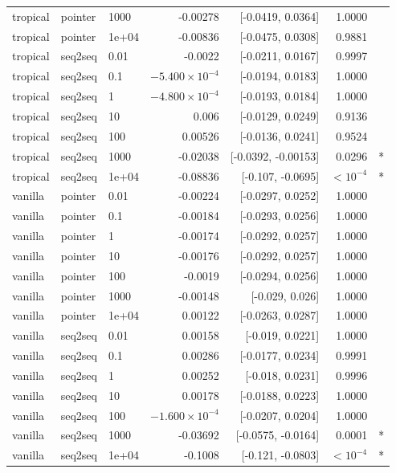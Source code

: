 \documentclass[10pt]{article}
\begin{document}
{\begin{longtable}{lllrrrl}
tropical & pointer & 1000 & -0.00278 & [-0.0419, 0.0364] & 1.0000 & \\
tropical & pointer & 1e+04 & -0.00836 & [-0.0475, 0.0308] & 0.9881 & \\
tropical & seq2seq & 0.01 & -0.0022 & [-0.0211, 0.0167] & 0.9997 & \\
tropical & seq2seq & 0.1 & $-5.400\times10^{-4}$ & [-0.0194, 0.0183] & 1.0000 & \\
tropical & seq2seq & 1 & $-4.800\times10^{-4}$ & [-0.0193, 0.0184] & 1.0000 & \\
tropical & seq2seq & 10 & 0.006 & [-0.0129, 0.0249] & 0.9136 & \\
tropical & seq2seq & 100 & 0.00526 & [-0.0136, 0.0241] & 0.9524 & \\
tropical & seq2seq & 1000 & -0.02038 & [-0.0392, -0.00153] & 0.0296 & *\\
tropical & seq2seq & 1e+04 & -0.08836 & [-0.107, -0.0695] & $<10^{-4}$ & *\\
vanilla & pointer & 0.01 & -0.00224 & [-0.0297, 0.0252] & 1.0000 & \\
vanilla & pointer & 0.1 & -0.00184 & [-0.0293, 0.0256] & 1.0000 & \\
vanilla & pointer & 1 & -0.00174 & [-0.0292, 0.0257] & 1.0000 & \\
vanilla & pointer & 10 & -0.00176 & [-0.0292, 0.0257] & 1.0000 & \\
vanilla & pointer & 100 & -0.0019 & [-0.0294, 0.0256] & 1.0000 & \\
vanilla & pointer & 1000 & -0.00148 & [-0.029, 0.026] & 1.0000 & \\
vanilla & pointer & 1e+04 & 0.00122 & [-0.0263, 0.0287] & 1.0000 & \\
vanilla & seq2seq & 0.01 & 0.00158 & [-0.019, 0.0221] & 1.0000 & \\
vanilla & seq2seq & 0.1 & 0.00286 & [-0.0177, 0.0234] & 0.9991 & \\
vanilla & seq2seq & 1 & 0.00252 & [-0.018, 0.0231] & 0.9996 & \\
vanilla & seq2seq & 10 & 0.00178 & [-0.0188, 0.0223] & 1.0000 & \\
vanilla & seq2seq & 100 & $-1.600\times10^{-4}$ & [-0.0207, 0.0204] & 1.0000 & \\
vanilla & seq2seq & 1000 & -0.03692 & [-0.0575, -0.0164] & 0.0001 & *\\
vanilla & seq2seq & 1e+04 & -0.1008 & [-0.121, -0.0803] & $<10^{-4}$ & *\\
\bottomrule
\end{longtable}
}
\end{document}
